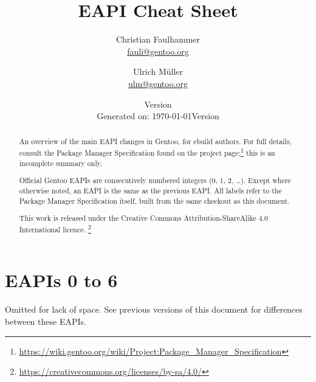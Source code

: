 \documentclass[a4paper,nofoldmark]{leaflet}
\title{EAPI Cheat Sheet}
\author{%
    Christian Faulhammer \\
    \href{mailto:fauli@gentoo.org}{fauli@gentoo.org}
    \and
    Ulrich Müller \\
    \href{mailto:ulm@gentoo.org}{ulm@gentoo.org}
}
\date{Version \version \\ Generated on: \today}
\date{Version \version \\ \printdate{\gitCommitterDate}}
\newcommand{\code}[1]{\texttt{#1}}
\newcommand{\featureref}[1]{\textsc{#1} on page~\pageref{feat:#1}}
\begin{document}
\maketitle
\thispagestyle{empty}
\begin{abstract}
    An overview of the main EAPI changes in Gentoo, for ebuild
    authors.  For full details, consult the Package Manager
    Specification found on the project page;\footnote{%
    \url{https://wiki.gentoo.org/wiki/Project:Package_Manager_Specification}}
    this is an incomplete summary only.

    Official Gentoo EAPIs are consecutively numbered integers (0, 1,
    2, \dots).  Except where otherwise noted, an EAPI is the same as
    the previous EAPI\@.  All labels refer to the Package Manager
    Specification itself, built from the same checkout as this
    document.

    This work is released under the Creative Commons
    Attribution-ShareAlike 4.0 International licence.%
    \footnote{\url{https://creativecommons.org/licenses/by-sa/4.0/}}
\end{abstract}

\section{EAPIs 0 to 6}
\label{sec:cs:eapi0-2}
Omitted for lack of space. See previous versions of this document for
differences between these EAPIs.


\end{document}
